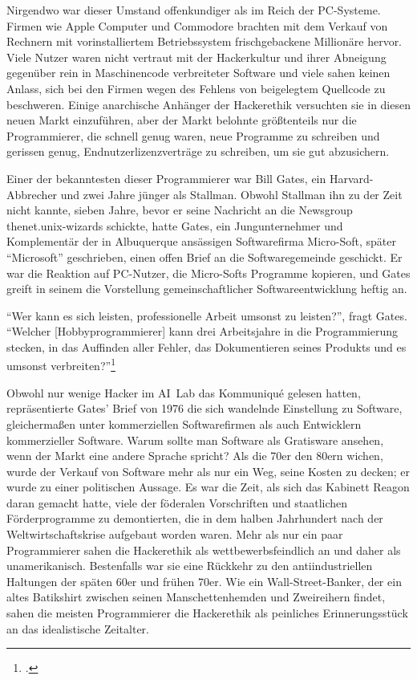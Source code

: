 Nirgendwo war dieser Umstand offenkundiger als im Reich der PC-Systeme. Firmen wie Apple Computer und Commodore brachten mit dem Verkauf von Rechnern mit vorinstalliertem Betriebssystem frischgebackene Millionäre hervor. Viele Nutzer waren nicht vertraut mit der Hackerkultur und ihrer Abneigung gegenüber rein in Maschinencode verbreiteter Software und viele sahen keinen Anlass, sich bei den Firmen wegen des Fehlens von beigelegtem Quellcode zu beschweren. Einige anarchische Anhänger der Hackerethik versuchten sie in diesen neuen Markt einzuführen, aber der Markt belohnte größtenteils nur die Programmierer, die schnell genug waren, neue Programme zu schreiben und gerissen genug, Endnutzerlizenzverträge zu schreiben, um sie gut abzusichern.

Einer der bekanntesten dieser Programmierer war Bill Gates, ein Harvard-Abbrecher und zwei Jahre jünger als Stallman. Obwohl Stallman ihn zu der Zeit nicht kannte, sieben Jahre, bevor er seine Nachricht an die Newsgroup thenet.unix-wizards schickte, hatte Gates, ein Jungunternehmer und Komplementär der in Albuquerque ansässigen Softwarefirma Micro-Soft, später "`Microsoft"' geschrieben, einen offen Brief an die Softwaregemeinde geschickt. Er war die Reaktion auf PC-Nutzer, die Micro-Softs Programme kopieren, und Gates greift in seinem  die Vorstellung gemeinschaftlicher Softwareentwicklung heftig an.

"`Wer kann es sich leisten, professionelle Arbeit umsonst zu leisten?"', fragt Gates. "`Welcher [Hobbyprogrammierer] kann drei Arbeitsjahre in die Programmierung stecken, in das Auffinden aller Fehler, das Dokumentieren seines Produkts und es umsonst verbreiten?"'\footcite[Vgl.][]{gatesletter}

Obwohl nur wenige Hacker im AI~Lab das Kommuniqué gelesen hatten, repräsentierte Gates' Brief von 1976 die sich wandelnde Einstellung zu Software, gleichermaßen unter kommerziellen Softwarefirmen als auch Entwicklern kommerzieller Software. Warum sollte man Software als Gratisware ansehen, wenn der Markt eine andere Sprache spricht? Als die 70er den 80ern wichen, wurde der Verkauf von Software mehr als nur ein Weg, seine Kosten zu decken; er wurde zu einer politischen Aussage. Es war die Zeit, als sich das Kabinett Reagon daran gemacht hatte, viele der föderalen Vorschriften und staatlichen Förderprogramme zu demontierten, die in dem halben Jahrhundert nach der Weltwirtschaftskrise aufgebaut worden waren. Mehr als nur ein paar Programmierer sahen die Hackerethik als wettbewerbsfeindlich an und daher als unamerikanisch. Bestenfalls war sie eine Rückkehr zu den antiindustriellen Haltungen der späten 60er und frühen 70er. Wie ein Wall-Street-Banker, der ein altes Batikshirt zwischen seinen Manschettenhemden und Zweireihern findet, sahen die meisten Programmierer die Hackerethik als peinliches Erinnerungsstück an das idealistische Zeitalter.

